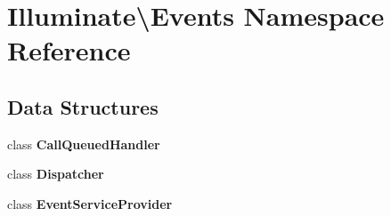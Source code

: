 \section{Illuminate\textbackslash{}Events Namespace Reference}
\label{namespace_illuminate_1_1_events}
\subsection*{Data Structures}
\begin{DoxyCompactItemize}
\item 
class {\bf Call\+Queued\+Handler}
\item 
class {\bf Dispatcher}
\item 
class {\bf Event\+Service\+Provider}
\end{DoxyCompactItemize}
